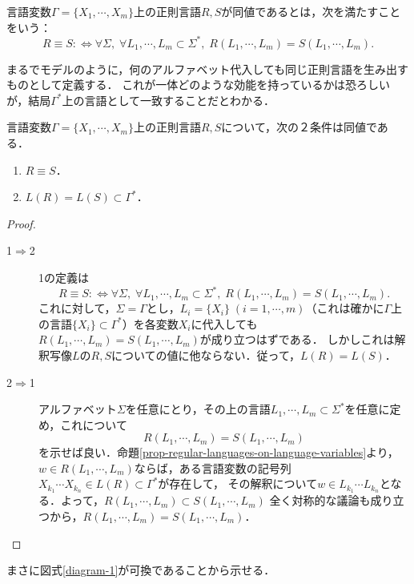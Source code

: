 \begin{definition}[言語変数上の正則表現の同値]\label{def-equivalence-of-universal-regex}
    言語変数$\Gamma=\{X_1,\cdots,X_m\}$上の正則言語$R,S$が同値であるとは，次を満たすことをいう：
    \[ R\equiv S:\Leftrightarrow \forall\Sigma,\;\forall L_1,\cdots,L_m\subset\Sigma^*,\;R(L_1,\cdots,L_m)=S(L_1,\cdots,L_m). \]
\end{definition}
\begin{remarks}
    まるでモデルのように，何のアルファベット代入しても同じ正則言語を生み出すものとして定義する．
    これが一体どのような効能を持っているかは恐ろしいが，結局$\Gamma^*$上の言語として一致することだとわかる．
\end{remarks}

\begin{theorem}[言語変数上の正則表現の同値の特徴付け]
    言語変数$\Gamma=\{X_1,\cdots,X_m\}$上の正則言語$R,S$について，次の２条件は同値である．
    \begin{enumerate}
        \item $R\equiv S$．
        \item $L(R)=L(S)\subset\Gamma^*$．
    \end{enumerate}
\end{theorem}
\begin{proof}\mbox{}
    \begin{description}
        \item[1$\Rightarrow$2] 1の定義は
        \[ R\equiv S:\Leftrightarrow \forall\Sigma,\;\forall L_1,\cdots,L_m\subset\Sigma^*,\;R(L_1,\cdots,L_m)=S(L_1,\cdots,L_m). \]
        これに対して，$\Sigma=\Gamma$とし，$L_i=\{X_i\}\;(i=1,\cdots,m)$（これは確かに$\Gamma$上の言語$\{X_i\}\subset\Gamma^*$）を各変数$X_i$に代入しても
        $R(L_1,\cdots,L_m)=S(L_1,\cdots,L_m)$が成り立つはずである．
        しかしこれは解釈写像$L$の$R,S$についての値に他ならない．従って，$L(R)=L(S)$．
        \item[2$\Rightarrow$1] アルファベット$\Sigma$を任意にとり，その上の言語$L_1,\cdots,L_m\subset\Sigma^*$を任意に定め，これについて
        \[ R(L_1,\cdots,L_m)=S(L_1,\cdots,L_m) \]
        を示せば良い．命題\ref{prop-regular-languages-on-language-variables}より，$w\in R(L_1,\cdots,L_m)$ならば，ある言語変数の記号列$X_{k_1}\cdots X_{k_n}\in L(R)\subset\Gamma^*$が存在して，
        その解釈について$w\in L_{k_1}\cdots L_{k_n}$となる．よって，$R(L_1,\cdots,L_m)\subset S(L_1,\cdots,L_m)$
        全く対称的な議論も成り立つから，$R(L_1,\cdots,L_m)=S(L_1,\cdots,L_m)$．
    \end{description}
\end{proof}
\begin{remarks}
    まさに図式\ref{diagram-1}が可換であることから示せる．
\end{remarks}

